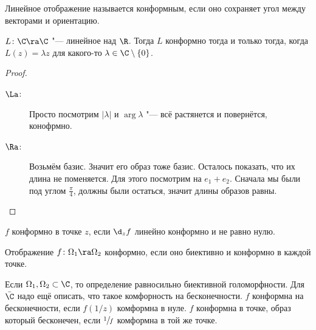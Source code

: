 \begin{Def}
	Линейное отображение называется конформным, если оно сохраняет угол между векторами и ориентацию.
\end{Def}

\begin{theorem}
	$L\colon \C \ra \C$ "--- линейное над $\R$.
	Тогда $L$ конформно тогда и только тогда, когда $L(z) = \lambda z$ для какого-то $\lambda \in \C \setminus \{0\}$.
\end{theorem}
\begin{proof}\begin{description}
\item[$\La$:] Просто посмотрим $|\lambda|$ и $\arg \lambda$ "--- всё растянется и повернётся, конофрмно.
\item[$\Ra$:] Возьмём базис. Значит его образ тоже базис. Осталось показать, что их длина не поменяется. Для этого посмотрим на $e_1 + e_2$.
	Сначала мы были под углом $\frac{\pi}4$, должны были остаться, значит длины образов равны.
\end{description}\end{proof}

\begin{Def}
	$f$ конформно в точке $z$, если $\d_z f$ линейно конформно и не равно нулю.
\end{Def}

\begin{Def}
	Отображение $f\colon \Omega_1 \ra \Omega_2$ конформно, если оно биективно и конформно в каждой точке.
\end{Def}
\begin{Rem}
	Если $\Omega_1, \Omega_2 \subset \C$, то определение равносильно биективной голоморфности.
	Для $\bar \C$ надо ещё описать, что такое комфорность на бесконечности.
	$f$ конформна на бесконечности, если $f(1/z)$ комформна в нуле.
	$f$ конформна в точке, образ который бесконечен, если $\sfrac1f$ комформна в той же точке.
\end{Rem}

